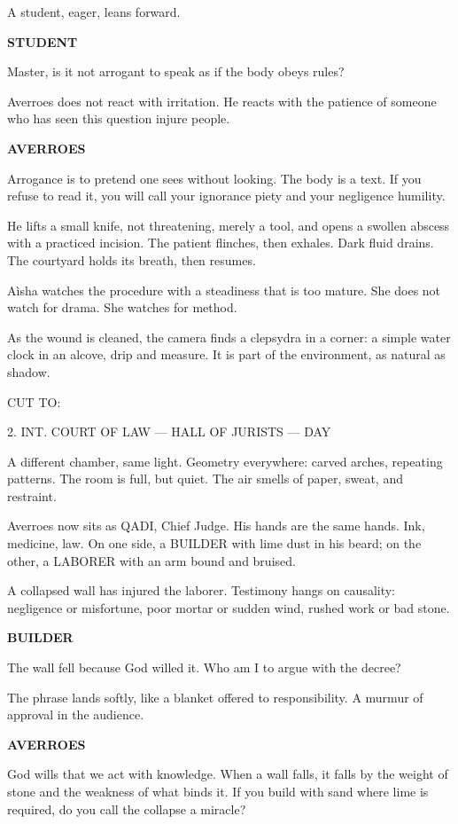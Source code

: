\documentclass[12pt]{article}
\newlength{\charindent}
\newlength{\dialogueindent}
\newlength{\dialoguewidth}
\newlength{\transitionindent}
\newcommand{\slug}[1]{\vspace{1.25em}\textsc{#1}\vspace{0.5em}}
\newcommand{\action}[1]{#1}
\newcommand{\character}[1]{%
  \par\vspace{0.75em}%
  \hspace*{\charindent}\textbf{#1}%
}
\newcommand{\dialogue}[1]{%
  \par\nobreak
  \hspace*{\dialogueindent}%
  \begin{minipage}[t]{\dialoguewidth}
  #1
  \end{minipage}
}
\newcommand{\transition}[1]{%
  \par\vspace{1em}%
  \hspace*{\transitionindent}\textsc{#1}%
}
\begin{document}
\action{A student, eager, leans forward.}

\character{STUDENT}
\dialogue{Master, is it not arrogant to speak as if the body obeys rules?}

\action{Averroes does not react with irritation. He reacts with the patience of someone who has seen this question injure people.}

\character{AVERROES}
\dialogue{Arrogance is to pretend one sees without looking. The body is a text. If you refuse to read it, you will call your ignorance piety and your negligence humility.}

\action{He lifts a small knife, not threatening, merely a tool, and opens a swollen abscess with a practiced incision. The patient flinches, then exhales. Dark fluid drains. The courtyard holds its breath, then resumes.}

\action{A\`isha watches the procedure with a steadiness that is too mature. She does not watch for drama. She watches for method.}

\action{As the wound is cleaned, the camera finds a clepsydra in a corner: a simple water clock in an alcove, drip and measure. It is part of the environment, as natural as shadow.}

\transition{CUT TO:}

\slug{2. INT. COURT OF LAW --- HALL OF JURISTS --- DAY}

\action{A different chamber, same light. Geometry everywhere: carved arches, repeating patterns. The room is full, but quiet. The air smells of paper, sweat, and restraint.}

\action{Averroes now sits as QADI, Chief Judge. His hands are the same hands. Ink, medicine, law. On one side, a BUILDER with lime dust in his beard; on the other, a LABORER with an arm bound and bruised.}

\action{A collapsed wall has injured the laborer. Testimony hangs on causality: negligence or misfortune, poor mortar or sudden wind, rushed work or bad stone.}

\character{BUILDER}
\dialogue{The wall fell because God willed it. Who am I to argue with the decree?}

\action{The phrase lands softly, like a blanket offered to responsibility. A murmur of approval in the audience.}

\character{AVERROES}
\dialogue{God wills that we act with knowledge. When a wall falls, it falls by the weight of stone and the weakness of what binds it. If you build with sand where lime is required, do you call the collapse a miracle?}
\end{document}
